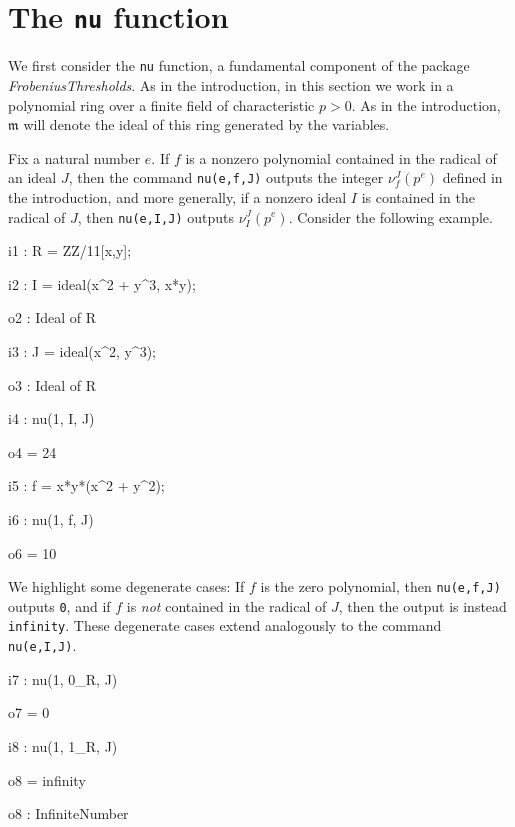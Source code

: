 \documentclass{amsart}
\newcommand{\idealm}{\mathfrak{m}}
\begin{document}
\section{The {\tt nu} function}
\label{sec.Nu}


We first consider the {\tt nu} function, a fundamental component of the package \emph{FrobeniusThresholds}.   As in the introduction, in this section we work in a polynomial ring over a finite field of characteristic $p>0$.  As in the introduction, $\idealm$ will denote the ideal of this ring generated by the variables. 

Fix a natural number $e$.  If $f$ is a nonzero polynomial contained in the radical of an ideal $J$, then the command {\tt nu(e,f,J)} outputs the integer $\nu_f^J(p^e)$ defined in the introduction, and
more generally, if a nonzero ideal $I$ is contained in the radical of $J$, then {\tt nu(e,I,J)} outputs $\nu_I^J(p^e)$. Consider the following example.  %

{\small
{}
\begin{MyVerbatim}

i1 : R = ZZ/11[x,y];

i2 : I = ideal(x^2 + y^3, x*y);

o2 : Ideal of R

i3 : J = ideal(x^2, y^3);

o3 : Ideal of R

i4 : nu(1, I, J)

o4 = 24

i5 : f = x*y*(x^2 + y^2);

i6 : nu(1, f, J)

o6 = 10
\end{MyVerbatim}
}
\medspace


We highlight some degenerate cases:  If $f$ is the zero polynomial, then {\tt nu(e,f,J)} outputs {\tt 0}, and if $f$ is \emph{not} contained in the radical of $J$, then the output is instead {\tt infinity}.  These degenerate cases extend analogously to the command {\tt nu(e,I,J)}.

{\small
{}
\begin{MyVerbatim}

i7 : nu(1, 0_R, J)

o7 = 0

i8 : nu(1, 1_R, J)

o8 = infinity

o8 : InfiniteNumber
\end{MyVerbatim}
}
\medspace
\end{document}
